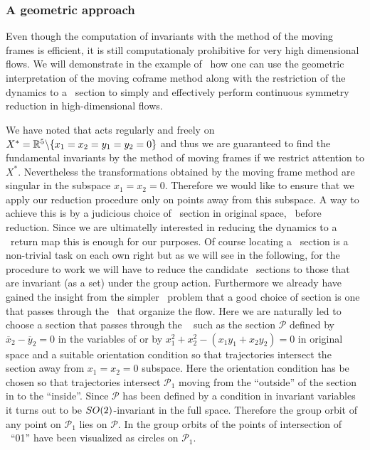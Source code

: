 \subsubsection{A geometric approach}
\label{laserMFnum}

Even though the computation of invariants with the method of the moving frames is efficient,
it is still computationaly prohibitive for very high dimensional flows. We will demonstrate
in the example of \CLe\ how one can use the geometric interpretation of the moving coframe method
along with the restriction of the dynamics to a \Poincare\ section to simply and effectively
perform continuous symmetry reduction in high-dimensional flows.

We have noted that  acts regularly and freely on $X^*=\mathbb{R}^{5}\backslash\{x_1=x_2=y_1=y_2=0\}$ and
thus we are guaranteed to find the fundamental invariants by the method of moving frames
if we restrict attention to $X^*$. Nevertheless the transformations 
obtained by the moving frame method are singular in the subspace $x_1=x_2=0$. Therefore
we would like to ensure that we apply our reduction procedure only on points away from this
subspace. A way to achieve this is by a judicious choice of \Poincare\ section in original space,
\ie~before reduction. Since we are ultimatelly interested in reducing the dynamics to a \Poincare\
return map this is enough for our purposes. Of course locating a \Poincare\ section is a non-trivial
task on each own right but as we will see in the following, for the procedure to work we will
have to reduce the candidate \Poincare\ sections to those that are invariant (as a set) under
the group action. Furthermore we already have gained the insight from the simpler \Le\ problem
that a good choice of section is one that passes through the \eqva\ that organize the flow.
Here we are naturally led to choose a section that passes through the \reqv~\REQB{1} such as the
section $\mathcal{P}$ defined by $\overline{x}_2-\overline{y}_2=0$ in the variables of
\refeq{eq:invLaser} or by $x_1^2+x_2^2-(x_1 y_1 + x_2 y_2)=0$ in original space and
a suitable orientation condition so that trajectories intersect the section away from
$x_1=x_2=0$ subspace. Here the orientation condition has be chosen so that trajectories intersect
$\mathcal{P}_1$ moving from the ``outside'' of the section in \reffig{fig:CLEmartini} to the
``inside''.
Since $\mathcal{P}$ has been defined by a condition in invariant variables 
it turns out to be $SO(2)$-invariant in the full space. Therefore the group orbit of any point on
$\mathcal{P}_1$ lies on $\mathcal{P}$. In \reffig{fig:CLEmartini} the group orbits of the points
of intersection of \rpo~``01'' have been visualized as circles on $\mathcal{P}_1$.

